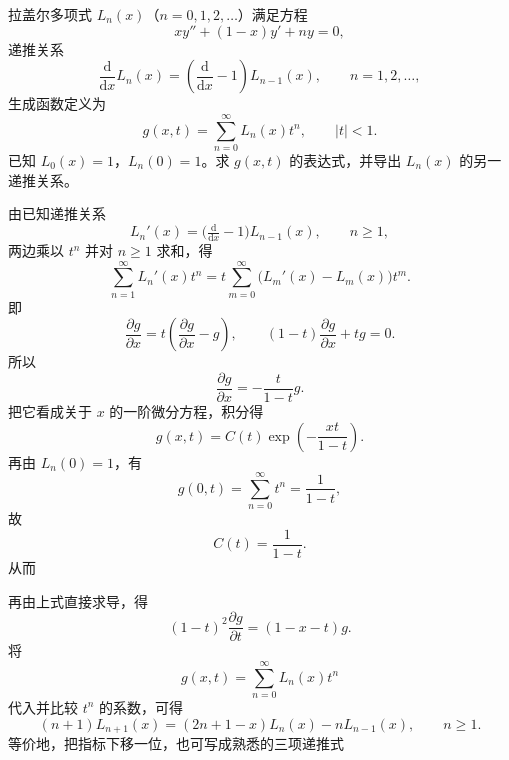 \begin{question}[第4题（20分）]

拉盖尔多项式 $L_n(x)$（$n=0,1,2,\dots$）满足方程
\[
xy''+(1-x)y'+ny=0,
\]
递推关系
\[
\frac{\mathrm{d}}{\mathrm{d}x}L_n(x)=\left(\frac{\mathrm{d}}{\mathrm{d}x}-1\right)L_{n-1}(x),\qquad n=1,2,\dots,
\]
生成函数定义为
\[
g(x,t)=\sum_{n=0}^{\infty}L_n(x)t^n,\qquad |t|<1.
\]
已知 $L_0(x)=1$，$L_n(0)=1$。求 $g(x,t)$ 的表达式，并导出 $L_n(x)$ 的另一递推关系。

\begin{solution}

由已知递推关系
\[
L_n'(x)=\bigl(\tfrac{\mathrm d}{\mathrm dx}-1\bigr)L_{n-1}(x),\qquad n\ge1,
\]
两边乘以 $t^n$ 并对 $n\ge1$ 求和，得
\[
\sum_{n=1}^{\infty}L_n'(x)t^n
=t\sum_{m=0}^{\infty}\bigl(L_m'(x)-L_m(x)\bigr)t^m.
\]
即
\[
\frac{\partial g}{\partial x}=t\left(\frac{\partial g}{\partial x}-g\right),
\qquad
(1-t)\frac{\partial g}{\partial x}+tg=0.
\]
所以
\[
\frac{\partial g}{\partial x}=-\frac{t}{1-t}g.
\]
把它看成关于 $x$ 的一阶微分方程，积分得
\[
g(x,t)=C(t)\exp\!\left(-\frac{xt}{1-t}\right).
\]
再由 $L_n(0)=1$，有
\[
g(0,t)=\sum_{n=0}^{\infty}t^n=\frac1{1-t},
\]
故
\[
C(t)=\frac1{1-t}.
\]
从而

再由上式直接求导，得
\[
(1-t)^2\frac{\partial g}{\partial t}=(1-x-t)g.
\]
将
\[
g(x,t)=\sum_{n=0}^{\infty}L_n(x)t^n
\]
代入并比较 $t^n$ 的系数，可得
\[
(n+1)L_{n+1}(x)=(2n+1-x)L_n(x)-nL_{n-1}(x),\qquad n\ge1.
\]
等价地，把指标下移一位，也可写成熟悉的三项递推式

\end{solution}
\end{question}

